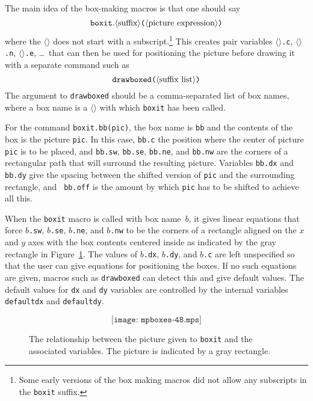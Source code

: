 \documentclass{article} %
\newcommand\descr[1]{{\langle\hbox{\rm#1}\rangle}}
\newcommand\invisgap{\nobreak\hskip0pt\relax}
\newcommand\tdescr[1]{$\langle$\invisgap{\rm#1}\invisgap$\rangle$}
\begin{document}
\mbox{}%
%
%
%
The main idea of the box-making macros is that one should
say\label{Dboxit}
$$ {\tt boxit.} \descr{suffix}
   \hbox{\tt(} \descr{picture expression} \hbox{\tt)}
$$
where the \tdescr{suffix} does not start with a subscript.\footnote{Some early
versions of the box making macros did not allow any subscripts in the
{\tt boxit} suffix.}
This creates pair variables \tdescr{suffix}{\tt.c},
\tdescr{suffix}{\tt.n}, \tdescr{suffix}{\tt.e}, \ldots\ that can then be
used for positioning the picture before drawing it with a separate command such
as\label{Ddrbxed}
$$ \hbox{\tt drawboxed(} \descr{suffix list} \hbox{\tt )} $$
The argument to {\tt drawboxed} should be a comma-separated list of box names,
where a box name is a \tdescr{suffix} with which {\tt boxit}
has been called.

For the command {\tt boxit.bb(pic)}, the box name is {\tt bb} and the
contents of the box is the picture {\tt pic}.  In this case, {\tt bb.c}
the position where the center of picture {\tt pic} is to be placed, and
{\tt bb.sw}, {\tt bb.se}, {\tt bb.ne}, and {\tt bb.nw} are the corners
of a rectangular path that will surround the resulting picture.
Variables {\tt bb.dx} and {\tt bb.dy} give the spacing between the
shifted version of {\tt pic} and the surrounding rectangle, and {\tt
bb.off} is the amount by which {\tt pic} has to be shifted to achieve
all this.

When the {\tt boxit} macro is called with box name~$b$, it gives linear
equations that force $b${\tt.sw}, $b${\tt.se}, $b${\tt.ne}, and
$b${\tt.nw} to be the corners of a rectangle aligned on the $x$ and $y$
axes with the box contents centered inside as indicated by the gray
rectangle in Figure~\ref{fig48}.  The values of $b${\tt.dx},
$b${\tt.dy}, and $b${\tt.c} are left unspecified so that the user can
give equations for positioning the boxes.  If no such equations are
given, macros such as {\tt drawboxed} can detect this and give default
values.  The default values for {\tt dx} and {\tt dy} variables are
controlled by the internal variables {\tt
defaultdx}\label{Ddefaultdx} and
{\tt defaultdy}\label{Ddefaultdy}.%
%

\begin{figure}[htp]
$$ \texttt{[image: mpboxes-48.mps]} $$
\caption[How a {\tt boxit} picture relates to the associated variables]
        {The relationship between the picture given to {\tt boxit} and the
        associated variables.  The picture is indicated by a gray rectangle.}
\label{fig48}
\end{figure}
\end{document}
